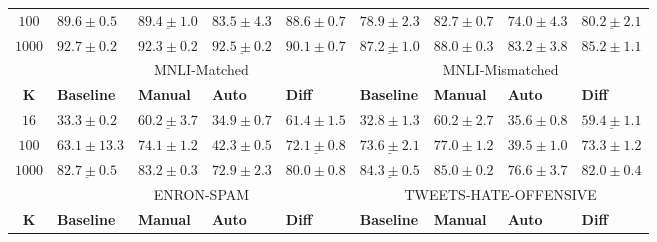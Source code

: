 \begin{table*}[!ht]
{\begin{tabular}{c | llll | llll }
	\\
	$100$  
	& $\boldsymbol{89.6 \pm 0.5}$ 
    & $\underline{89.4 \pm 1.0}$  
	& $83.5 \pm 4.3$              
	& $88.6 \pm 0.7$                 
        & $78.9 \pm 2.3$
        & $\boldsymbol{82.7 \pm 0.7}$
        & $74.0 \pm 4.3$
        & $\underline{80.2 \pm 2.1}$
        \\
	$1000$
	& $\boldsymbol{92.7 \pm 0.2}$     
    & $92.3 \pm 0.2$
	& $\underline{92.5 \pm 0.2}$
        & $90.1 \pm 0.7$
        & $\underline{87.2 \pm 1.0}$
         & $\boldsymbol{88.0 \pm 0.3}$
        & $83.2 \pm 3.8$
        & $85.2 \pm 1.1$
        \\
	\midrule
	\multicolumn{1}{c}{}                      
	& \multicolumn{4}{c}{MNLI-Matched}                      
	& \multicolumn{4}{c}{MNLI-Mismatched} \\
	$\boldsymbol{K}$ 
        & \textbf{Baseline} & \textbf{Manual} & \textbf{Auto}	& \textbf{Diff} 
	& \textbf{Baseline} & \textbf{Manual} & \textbf{Auto}	& \textbf{Diff} \\
	\midrule
        $16$
        & $33.3 \pm 0.2$
        & $\underline{60.2 \pm 3.7}$
        & $34.9 \pm 0.7$
        & $\boldsymbol{61.4 \pm 1.5}$
        & $32.8 \pm 1.3$
        & $\boldsymbol{60.2 \pm 2.7}$
        & $35.6 \pm 0.8$
        & $\underline{59.4 \pm 1.1}$ \\
        $100$
        & $63.1 \pm 13.3$
        & $\boldsymbol{74.1 \pm 1.2}$
        & $42.3 \pm 0.5$
        & $\underline{72.1 \pm 0.8}$
        & $\underline{73.6 \pm 2.1}$
        & $\boldsymbol{77.0 \pm 1.2}$
        & $39.5 \pm 1.0$
        & $73.3 \pm 1.2$ \\	
        $1000$
        & $\underline{82.7 \pm 0.5}$
        & $\boldsymbol{83.2 \pm 0.3}$
        & $72.9 \pm 2.3$
        & $80.0 \pm 0.8$
        & $\underline{84.3 \pm 0.5}$
        & $\boldsymbol{85.0 \pm 0.2}$
        & $76.6 \pm 3.7$
        & $82.0 \pm 0.4$ \\
        \midrule
	\multicolumn{1}{c}{}                      
	& \multicolumn{4}{c}{ENRON-SPAM}                      
	& \multicolumn{4}{c}{TWEETS-HATE-OFFENSIVE} \\
	$\boldsymbol{K}$ 
        & \textbf{Baseline} & \textbf{Manual} & \textbf{Auto}	& \textbf{Diff} 
	& \textbf{Baseline} & \textbf{Manual} & \textbf{Auto}	& \textbf{Diff} \\
        \midrule

\end{tabular}}
\end{table*}
